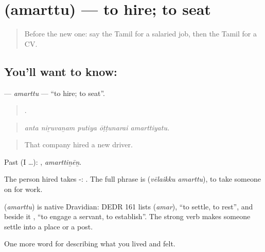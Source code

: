 \section[\texorpdfstring{\ta{அமர்த்து} (amarttu)}{அமர்த்து (amarttu)}]{ (amarttu) — to hire; to seat}

\label{lesson:TA-C506-amarttu}



\begin{quote}
Before the new one: say the Tamil for a salaried job, then the Tamil for a CV.
\end{quote}

\subsection*{You'll want to know: }
\textbf{} — \emph{amarttu} — \textquotedblleft{}to hire; to seat\textquotedblright{}.

\begin{quote}
    .
\end{quote}

\begin{quote}
\emph{anta niṟuvaṉam putiya ōṭṭunarai amarttiyatu.}
\end{quote}

\begin{quote}
That company hired a new driver.
\end{quote}

Past (I …): , \emph{amarttiṉēṉ}.

The person hired takes -:  . The full phrase is   (\emph{vēlaikku amarttu}), to take someone on for work.

\begin{cousinweb}
\textbf{} (\emph{amarttu}) is native Dravidian: DEDR 161 lists  (\emph{amar}), \textquotedblleft{}to settle, to rest\textquotedblright{}, and beside it , \textquotedblleft{}to engage a servant, to establish\textquotedblright{}. The strong verb makes someone settle into a place or a post.
\end{cousinweb}

\begin{grammarlens}[title={What you've built}]
One more word for describing what you lived and felt.
\end{grammarlens}

